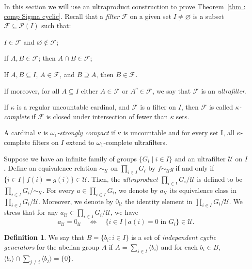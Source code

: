 \documentclass[a4paper]{amsart}
\newenvironment{enumerate-(1)-r}{\begin{enumerate}[label={\upshape (\arabic*)}, leftmargin=2pc,resume]}{\end{enumerate}}
\theoremstyle{definition}
\newtheorem{definition}[theorem]{Definition}
\theoremstyle{remark}
\numberwithin{equation}{section}
\begin{document}
In this section we will use an ultraproduct construction to prove Theorem~\ref{thm : comp Sigma cyclic}.
Recall that a \emph{filter}
$\mathcal{F}$ on a given set $I \neq \varnothing$ is a subset $\mathcal{F} \subseteq \mathcal{P}(I)$ such that:
\begin{enumerate-(1)-r}
    \item $I \in \mathcal{F}$ and $\varnothing \notin \mathcal{F}$;
    \item If $A,B \in \mathcal{F}$; then $A \cap B \in \mathcal{F}$;
    \item If $A, B \subseteq I$, $A \in \mathcal{F}$, and $B \supseteq A$, then $B \in \mathcal{F}$.
\end{enumerate-(1)-r}
If moreover,  for all $A \subseteq I$ either $A \in \mathcal{F}$ or $A^c \in \mathcal{F}$, we say that \(\mathcal{F}\) is an \emph{ultrafilter}.


If \(\kappa\) is a regular uncountable cardinal, and \(\mathcal{F}\) is a filter on \(I\), then \(\mathcal{F}\) is called \emph{\(\kappa\)-complete} if \(\mathcal{F}\) is closed under intersection of fewer than \(\kappa\) sets.




A cardinal $\kappa$ is \emph{$\omega_1$-strongly compact} if $\kappa$ is uncountable and for every set I, all $\kappa$-complete filters on $I$ extend to $\omega_1$-complete ultrafilters. 


Suppose we have an infinite family of groups $\{G_i \mid i \in I\}$ and an ultrafilter $\mathcal{U}$ on $I$. Define an equivalence relation $\sim_\mathcal{U}$ on $\prod_{i \in I} G_i$ by $f \sim_\mathcal{U} g$ if and only if $\{i \in I \mid f(i) = g(i)\} \in \mathcal{U}$. Then, the \emph{ultraproduct} $\prod_{i \in I} G_i / \mathcal{U}$ is defined to be $\prod_{i \in I} G_i / {\sim_\mathcal{U}}$.
For every \(a\in \prod_{i \in I} G_i \), we denote by \(a_\mathcal{U}\) its equivalence class in \(\prod_{i \in I} G_i / \mathcal{U}\).
Moreover, we denote by \(0_\mathcal{U}\) the identity element in 
$\prod_{i \in I} G_i / \mathcal{U}$. 
We stress that for any \(a_\mathcal{U} \in \prod_{i \in I} G_i / \mathcal{U}\), we have
\[
a_\mathcal{U} = 0_\mathcal{U}\quad \iff \quad\{i\in I \mid a(i)= 0\text{ in \(G_i\)} \}\in\mathcal{U}.
\]


\begin{definition}
    We say that $B=\{b_i:i\in I\}$ is a set of \emph{independent cyclic generators} for the abelian group $A$ if $A = \sum_{i\in I} \langle b_i\rangle$ and for each $b_i \in B$, $\langle b_i \rangle \cap \sum_{j \neq i} \langle b_j \rangle = \{0\}$.
\end{definition}
\end{document}
